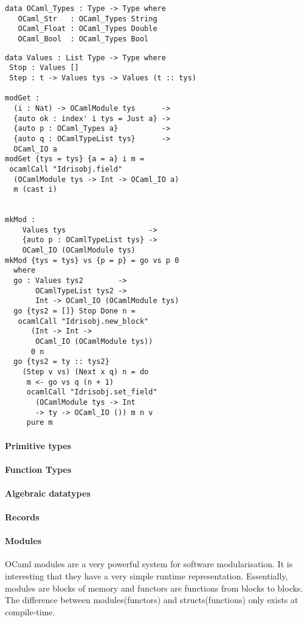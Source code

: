 \documentclass[a4paper,11pt,twocolumn]{article}
\begin{document}
\begin{lstlisting}
data OCaml_Types : Type -> Type where
   OCaml_Str   : OCaml_Types String
   OCaml_Float : OCaml_Types Double
   OCaml_Bool  : OCaml_Types Bool
\end{lstlisting}


\begin{lstlisting}
data Values : List Type -> Type where
 Stop : Values []
 Step : t -> Values tys -> Values (t :: tys)

modGet :
  (i : Nat) -> OCamlModule tys      ->
  {auto ok : index' i tys = Just a} ->
  {auto p : OCaml_Types a}          -> 
  {auto q : OCamlTypeList tys}      ->
  OCaml_IO a
modGet {tys = tys} {a = a} i m = 
 ocamlCall "Idrisobj.field" 
  (OCamlModule tys -> Int -> OCaml_IO a) 
  m (cast i)


mkMod : 
    Values tys                   -> 
    {auto p : OCamlTypeList tys} ->
    OCaml_IO (OCamlModule tys)
mkMod {tys = tys} vs {p = p} = go vs p 0 
  where
  go : Values tys2        ->
       OCamlTypeList tys2 ->
       Int -> OCaml_IO (OCamlModule tys)
  go {tys2 = []} Stop Done n =
   ocamlCall "Idrisobj.new_block" 
      (Int -> Int -> 
       OCaml_IO (OCamlModule tys)) 
      0 n
  go {tys2 = ty :: tys2} 
    (Step v vs) (Next x q) n = do
     m <- go vs q (n + 1)
     ocamlCall "Idrisobj.set_field" 
       (OCamlModule tys -> Int 
       -> ty -> OCaml_IO ()) m n v
     pure m 
\end{lstlisting}

\paragraph{Primitive types}



\paragraph{Function Types}

\paragraph{Algebraic datatypes}

\paragraph{Records}

\paragraph{Modules}
OCaml modules are a very powerful system for software modularisation. 
It is interesting that they have a very simple runtime representation.
Essentially,  modules are blocks of memory and functors are functions
from blocks to blocks. The difference between modules(functors) and
structs(functions) only exists at compile-time.
\end{document}
